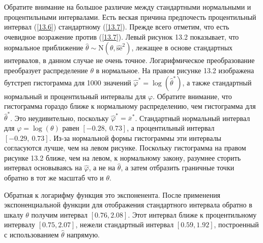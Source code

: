 Обратите внимание на большое различие между стандартными нормальными и процентильными интервалами. Есть веская причина предпочесть процентильный интервал (\ref{13.6}) стандартному (\ref{13.7}). Прежде всего отметим, что есть очевидное возражение против (\ref{13.7}). Левый рисунок 13.2 показывает, что нормальное приближение $\widehat{\theta} \sim \mathrm{N}(\theta, \widehat{\text{se}}^{2})$, лежащее в основе стандартных интервалов, в данном случае не очень точное. Логарифмическое преобразование преобразует распределение $\theta$ в нормальное. На правом рисунке 13.2 изображена бутстреп гистограмма для 1000 значений $\widehat{\varphi}^{*} = \log(\widehat{\theta}^{*})$, а также стандартный нормальный и процентильный интервалы для $\varphi$. Обратите внимание, что гистограмма гораздо ближе к нормальному распределению, чем гистограмма для $\widehat{\theta}^{*}$. Это неудивительно, поскольку  $\widehat{\varphi}^{*} = \overline{x}^{*}$. Стандартный нормальный интервал для $\varphi = \log(\theta)$ равен $[-0.28,\ 0.73]$, а процентильный интервал $[-0.29,\ 0.73]$. Из-за нормальной формы гистограммы эти интервалы согласуются лучше, чем на левом рисунке. Поскольку гистограмма на правом рисунке 13.2 ближе, чем на левом, к нормальному закону, разумнее сторить интервал основываясь на $\widehat{\varphi}$, а не на $\widehat{\theta}$, а затем отбразить граничные точки обратно в тот же масштаб что и $\theta$.

\begin{figure}[H]
\end{figure}

Обратная к логарифму функция это экспоненента. После применения экспоненциальной функции для отображения стандартного интервала обратно в шкалу $\theta$ получим интервал $[0.76, 2.08]$. Этот интервал ближе к процентильному интервалу $[0.75, 2.07]$, нежели стандартный интервал $[0.59, 1.92]$, построенный с использованием $\widehat{\theta}$ напрямую.

